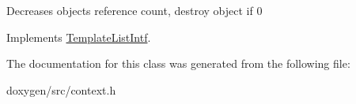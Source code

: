 Decreases object\textquotesingle{}s reference count, destroy object if 0 

Implements \mbox{\hyperlink{class_template_list_intf_a0c53169c740c09dac47efc62bbe39674}{Template\+List\+Intf}}.



The documentation for this class was generated from the following file\+:\begin{DoxyCompactItemize}
\item 
doxygen/src/context.\+h\end{DoxyCompactItemize}
